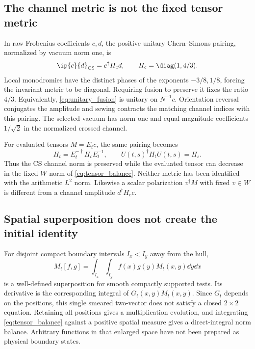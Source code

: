 \subsection{The channel metric is not the fixed tensor metric}

In raw Frobenius coefficients $c,d$, the positive unitary Chern--Simons
pairing, normalized by vacuum norm one, is
\begin{equation}
 \ip{c}{d}_{\rm CS}=c^\dagger H_c d,
 \qquad H_c=\diag(1,4/3).
 \label{eq:channel_metric}
\end{equation}
Local monodromies have the distinct phases of the exponents $-3/8,1/8$,
forcing the invariant metric to be diagonal. Requiring fusion to preserve
it fixes the ratio $4/3$. Equivalently, \eqref{eq:unitary_fusion} is
unitary on $N^{-1}c$. Orientation reversal conjugates the amplitude and
sewing contracts the matching channel indices with this pairing. The
selected vacuum has norm one and equal-magnitude coefficients $1/\sqrt2$
in the normalized crossed channel.

For evaluated tensors $M=E_tc$, the same pairing becomes
\begin{equation}
 H_t=E_t^{-\dagger}H_cE_t^{-1},\qquad
 U(t,s)^\dagger H_tU(t,s)=H_s.
 \label{eq:transported_metric}
\end{equation}
Thus the CS channel norm is preserved while the evaluated tensor can
decrease in the fixed $W$ norm of \eqref{eq:tensor_balance}. Neither
metric has been identified with the arithmetic $L^2$ norm.
Likewise a scalar polarization $v^\dagger M$ with fixed $v\in W$ is
different from a channel amplitude $d^\dagger H_cc$.

\subsection{Spatial superposition does not create the initial identity}

For disjoint compact boundary intervals $I_x<I_y$ away from the hull,
\begin{equation}
 M_t[f,g]=\int_{I_x}\int_{I_y}f(x)g(y)M_t(x,y)\dd y\dd x
\end{equation}
is a well-defined superposition for smooth compactly supported tests.
Its derivative is the corresponding integral of $G_t(x,y)M_t(x,y)$.
Since $G_t$ depends on the positions, this single smeared two-vector does
not satisfy a closed $2\times2$ equation. Retaining all positions gives
a multiplication evolution, and integrating \eqref{eq:tensor_balance}
against a positive spatial measure gives a direct-integral norm balance.
Arbitrary functions in that enlarged space have not been prepared as
physical boundary states.

